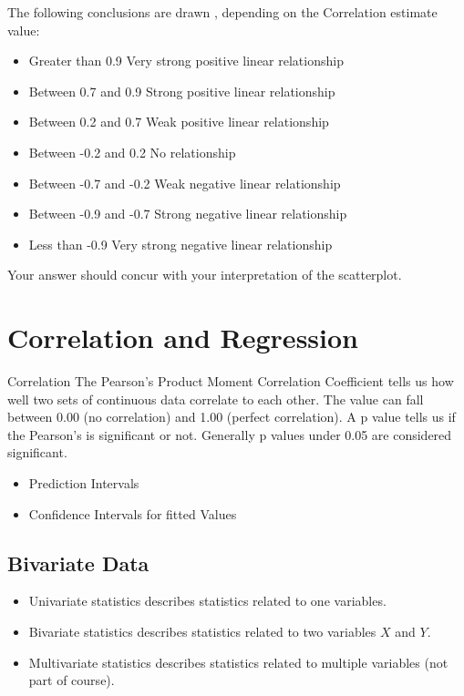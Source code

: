 The following conclusions are drawn , depending on the Correlation estimate value:
\begin{itemize}
	\item Greater than 0.9 		Very strong positive linear relationship 
	\item Between 0.7 and 0.9		Strong positive linear relationship 
	\item Between 0.2 and 0.7	 	Weak positive linear relationship
	\item Between -0.2 and 0.2		No relationship
	\item Between -0.7 and -0.2		Weak negative linear relationship
	\item Between -0.9 and -0.7		Strong negative linear relationship
	\item Less than -0.9			Very strong negative linear relationship
\end{itemize}
Your answer should concur with your interpretation of the scatterplot.




\section{Correlation and Regression}
Correlation
The Pearson's Product Moment Correlation Coefficient tells us how well two sets of continuous data correlate to each other. The value can fall between 0.00 (no correlation) and 1.00 (perfect correlation). A p value tells us if the Pearson's is significant or not. Generally p values under 0.05 are considered significant.

\begin{itemize}
	\item Prediction Intervals
	\item Confidence Intervals for fitted Values
\end{itemize}



\subsection{Bivariate Data}
\begin{itemize}
	\item Univariate statistics describes statistics related to one variables.
	\item Bivariate statistics describes statistics related to two variables $X$ and $Y$.
	\item Multivariate statistics describes statistics related to multiple variables (not part of course).
\end{itemize}


